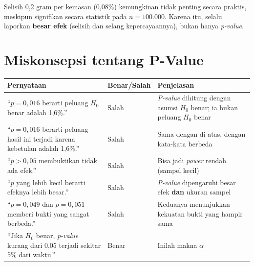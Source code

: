 \documentclass[
  indonesian,
  letterpaper,
]{book}
\newcounter{none} %
\begin{document}
Selisih 0,2 gram per kemasan (0,08\%) kemungkinan tidak penting secara
praktis, meskipun signifikan secara statistik pada \(n = 100.000\).
Karena itu, selalu laporkan \textbf{besar efek} (selisih dan selang
kepercayaannya), bukan hanya \emph{p-value}.

\section{Miskonsepsi tentang P-Value}\label{miskonsepsi-tentang-p-value}

{\def\LTcaptype{none} %
\begin{longtable}[]{@{}
  >{\raggedright\arraybackslash}p{}
  >{\centering\arraybackslash}p{}
  >{\raggedright\arraybackslash}p{}@{}}
\toprule\noalign{}
\begin{minipage}[b]{\linewidth}\raggedright
Pernyataan
\end{minipage} & \begin{minipage}[b]{\linewidth}\centering
Benar/Salah
\end{minipage} & \begin{minipage}[b]{\linewidth}\raggedright
Penjelasan
\end{minipage} \\
\midrule\noalign{}
\endhead
\bottomrule\noalign{}
\endlastfoot
``\(p = 0{,}016\) berarti peluang \(H_0\) benar adalah 1,6\%.'' & Salah
& \emph{P-value} dihitung dengan asumsi \(H_0\) benar; ia bukan peluang
\(H_0\) benar \\
``\(p = 0{,}016\) berarti peluang hasil ini terjadi karena kebetulan
adalah 1,6\%.'' & Salah & Sama dengan di atas, dengan kata-kata
berbeda \\
``\(p > 0{,}05\) membuktikan tidak ada efek.'' & Salah & Bisa jadi
\emph{power} rendah (sampel kecil) \\
``\(p\) yang lebih kecil berarti efeknya lebih besar.'' & Salah &
\emph{P-value} dipengaruhi besar efek \textbf{dan} ukuran sampel \\
``\(p = 0{,}049\) dan \(p = 0{,}051\) memberi bukti yang sangat
berbeda.'' & Salah & Keduanya menunjukkan kekuatan bukti yang hampir
sama \\
``Jika \(H_0\) benar, \emph{p-value} kurang dari 0,05 terjadi sekitar
5\% dari waktu.'' & Benar & Inilah makna \(\alpha\) \\
\end{longtable}
}
\end{document}
